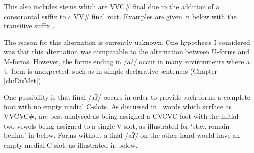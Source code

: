 This also includes stems which are VVC{\#} final due
to the addition of a consonantal suffix to a VV{\#} final root.
Examples are given in  below with the transitive suffix .

\begin{exe}
	\label{ex:VV-C/VV-CaqAlt}
\end{exe}

The reason for this alternation is currently unknown.
One hypothesis I considered was that
this alternation was comparable to the alternation between U-forms and M-forms.
However, the forms ending in /aʔ/ occur in many environments where
a U-form is unexpected, such as in simple declarative sentences (Chapter \ref{ch:DisMet}).

One possibility is that final /aʔ/ occurs in order
to provide such forms a complete foot with no empty medial C-slots.
As discussed in , words which surface as VVCVC{\#},
are best analysed as being assigned a CVCVC foot with the initial
two vowels being assigned to a single V-slot, as illustrated for 
`stay, remain behind' in  below.
Forms without a final /aʔ/ on the other hand would have an empty medial C-slot,
as illustrated in  below.

